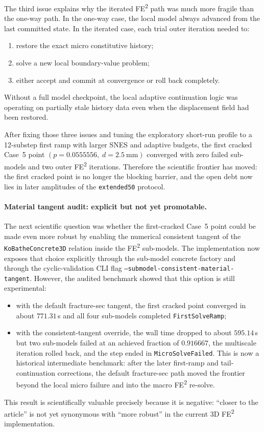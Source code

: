 The third issue explains why the iterated FE\textsuperscript{2} path was much
more fragile than the one-way path.  In the one-way case, the local model
always advanced from the last committed state.  In the iterated case, each
trial outer iteration needed to:
\begin{enumerate}
  \item restore the exact micro constitutive history;
  \item solve a new local boundary-value problem;
  \item either accept and commit at convergence or roll back completely.
\end{enumerate}
Without a full model checkpoint, the local adaptive continuation logic was
operating on partially stale history data even when the displacement field had
been restored.

After fixing those three issues and tuning the exploratory short-run profile to
a 12-substep first ramp with larger SNES and adaptive budgets, the first
cracked Case~5 point
\((p = 0.0555556,\; d = 2.5~\mathrm{mm})\) converged with zero failed
sub-models and two outer FE\textsuperscript{2} iterations.  Therefore the
scientific frontier has moved: the first cracked point is no longer the
blocking barrier, and the open debt now lies in later amplitudes of the
\texttt{extended50} protocol.

\paragraph{Material tangent audit: explicit but not yet promotable.}
The next scientific question was whether the first-cracked Case~5 point could
be made even more robust by enabling the numerical consistent tangent of the
\texttt{KoBatheConcrete3D} relation inside the FE\textsuperscript{2}
sub-models.  The implementation now exposes that choice explicitly through the
sub-model concrete factory and through the cyclic-validation CLI flag
\texttt{--submodel-consistent-material-tangent}.  However, the audited
benchmark showed that this option is still experimental:
\begin{itemize}
  \item with the default fracture-sec tangent, the first cracked point
    converged in about \(771.31\)\,s and all four sub-models completed
    \texttt{FirstSolveRamp};
  \item with the consistent-tangent override, the wall time dropped to about
    \(595.14\)\,s but two sub-models failed at an achieved fraction of
    \(0.916667\), the multiscale iteration rolled back, and the step ended in
    \texttt{MicroSolveFailed}.  This is now a historical intermediate
    benchmark: after the later first-ramp and tail-continuation corrections,
    the default fracture-sec path moved the frontier beyond the local micro
    failure and into the macro FE\textsuperscript{2} re-solve.
\end{itemize}
This result is scientifically valuable precisely because it is negative:
``closer to the article'' is not yet synonymous with ``more robust'' in the
current 3D FE\textsuperscript{2} implementation.

